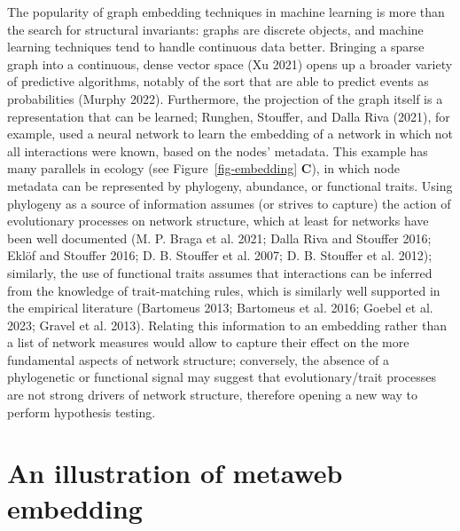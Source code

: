 \documentclass[
  letterpaper,
  DIV=11,
  numbers=noendperiod]{scrartcl}
\begin{document}
The popularity of graph embedding techniques in machine learning is more
than the search for structural invariants: graphs are discrete objects,
and machine learning techniques tend to handle continuous data better.
Bringing a sparse graph into a continuous, dense vector space (Xu 2021)
opens up a broader variety of predictive algorithms, notably of the sort
that are able to predict events as probabilities (Murphy 2022).
Furthermore, the projection of the graph itself is a representation that
can be learned; Runghen, Stouffer, and Dalla Riva (2021), for example,
used a neural network to learn the embedding of a network in which not
all interactions were known, based on the nodes' metadata. This example
has many parallels in ecology (see Figure~\ref{fig-embedding}
\textbf{C}), in which node metadata can be represented by phylogeny,
abundance, or functional traits. Using phylogeny as a source of
information assumes (or strives to capture) the action of evolutionary
processes on network structure, which at least for networks have been
well documented (M. P. Braga et al. 2021; Dalla Riva and Stouffer 2016;
Eklöf and Stouffer 2016; D. B. Stouffer et al. 2007; D. B. Stouffer et
al. 2012); similarly, the use of functional traits assumes that
interactions can be inferred from the knowledge of trait-matching rules,
which is similarly well supported in the empirical literature (Bartomeus
2013; Bartomeus et al. 2016; Goebel et al. 2023; Gravel et al. 2013).
Relating this information to an embedding rather than a list of network
measures would allow to capture their effect on the more fundamental
aspects of network structure; conversely, the absence of a phylogenetic
or functional signal may suggest that evolutionary/trait processes are
not strong drivers of network structure, therefore opening a new way to
perform hypothesis testing.

\hypertarget{an-illustration-of-metaweb-embedding}{%
\section{An illustration of metaweb
embedding}\label{an-illustration-of-metaweb-embedding}}
\end{document}
